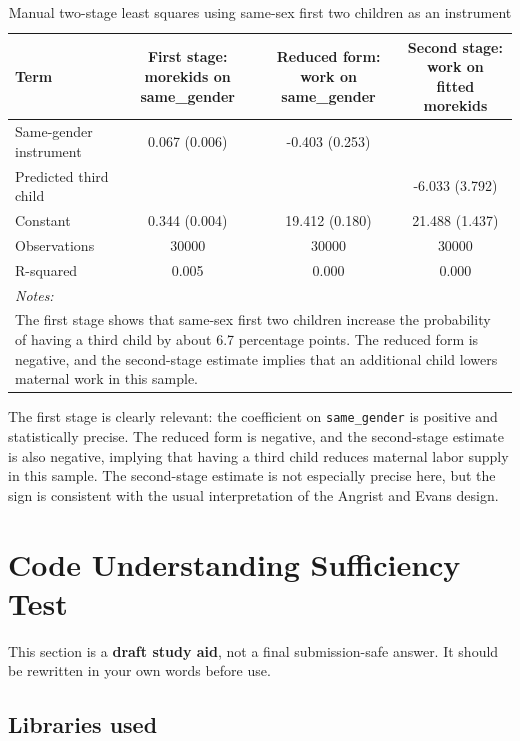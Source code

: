 \documentclass[
]{article}
\begin{document}
\begin{longtable}[t]{lccc}
\caption{\label{tab:iv-table}Manual two-stage least squares using same-sex first two children as an instrument}\\
\toprule
Term & First stage: morekids on same\_gender & Reduced form: work on same\_gender & Second stage: work on fitted morekids\\
\midrule
Same-gender instrument & 0.067 (0.006) & -0.403 (0.253) & \\
Predicted third child &  &  & -6.033 (3.792)\\
Constant & 0.344 (0.004) & 19.412 (0.180) & 21.488 (1.437)\\
Observations & 30000 & 30000 & 30000\\
R-squared & 0.005 & 0.000 & 0.000\\
\bottomrule
\multicolumn{4}{l}{\rule{0pt}{1em}\textit{Notes: }}\\
\multicolumn{4}{l}{\rule{0pt}{1em}The first stage shows that same-sex first two children increase the probability of having a third child by about 6.7 percentage points. The reduced form is negative, and the second-stage estimate implies that an additional child lowers maternal work in this sample.}\\
\end{longtable}

The first stage is clearly relevant: the coefficient on
\texttt{same\_gender} is positive and statistically precise. The reduced
form is negative, and the second-stage estimate is also negative,
implying that having a third child reduces maternal labor supply in this
sample. The second-stage estimate is not especially precise here, but
the sign is consistent with the usual interpretation of the Angrist and
Evans design.

\section{Code Understanding Sufficiency
Test}\label{code-understanding-sufficiency-test}

This section is a \textbf{draft study aid}, not a final submission-safe
answer. It should be rewritten in your own words before use.

\subsection{Libraries used}\label{libraries-used}
\end{document}
